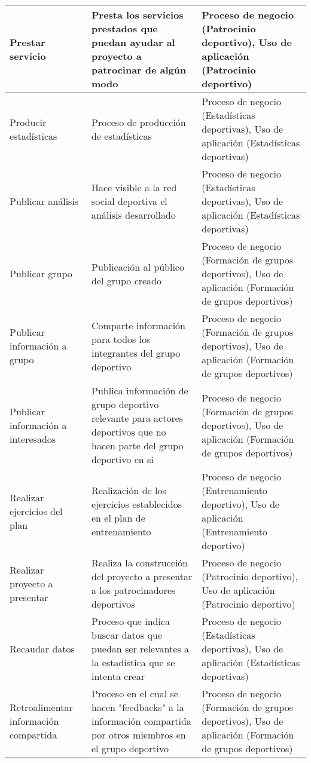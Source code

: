 \begin{center}
\begin{longtable}{|p{4cm}|p{7cm}|p{4cm}|}
		\\
		\hline
		Prestar servicio & 
		Presta los servicios prestados que puedan ayudar al proyecto a patrocinar de algún modo & 
		Proceso de negocio (Patrocinio deportivo), Uso de aplicación (Patrocinio deportivo)
		\\
		\hline
		Producir estadísticas & 
		Proceso de producción de estadísticas & 
		Proceso de negocio (Estadísticas deportivas), Uso de aplicación (Estadísticas deportivas)
		\\
		\hline
		Publicar análisis & 
		Hace visible a la red social deportiva el análisis desarrollado & 
		Proceso de negocio (Estadísticas deportivas), Uso de aplicación (Estadísticas deportivas)
		\\
		\hline
		Publicar grupo & 
		Publicación al público del grupo creado & 
		Proceso de negocio (Formación de grupos deportivos), Uso de aplicación (Formación de grupos deportivos)
		\\
		\hline
		Publicar información a grupo & 
		Comparte información para todos los integrantes del grupo deportivo & 
		Proceso de negocio (Formación de grupos deportivos), Uso de aplicación (Formación de grupos deportivos)
		\\
		\hline
		Publicar información a interesados & 
		Publica información de grupo deportivo relevante para actores deportivos que no hacen parte del grupo deportivo en si & 
		Proceso de negocio (Formación de grupos deportivos), Uso de aplicación (Formación de grupos deportivos)
		\\
		\hline
		Realizar ejercicios del plan & 
		Realización de los ejercicios establecidos en el plan de entrenamiento & 
		Proceso de negocio (Entrenamiento deportivo), Uso de aplicación (Entrenamiento deportivo)
		\\
		\hline
		Realizar proyecto a presentar & 
		Realiza la construcción del proyecto a presentar a los patrocinadores deportivos & 
		Proceso de negocio (Patrocinio deportivo), Uso de aplicación (Patrocinio deportivo)
		\\
		\hline
		Recaudar datos & 
		Proceso que indica buscar datos que puedan ser relevantes a la estadística que se intenta crear & 
		Proceso de negocio (Estadísticas deportivas), Uso de aplicación (Estadísticas deportivas)
		\\
		\hline
		Retroalimentar información compartida & 
		Proceso en el cual se hacen "feedbacks" a la información compartida por otros miembros en el grupo deportivo & 
		Proceso de negocio (Formación de grupos deportivos), Uso de aplicación (Formación de grupos deportivos)

\end{longtable}
\end{center}
